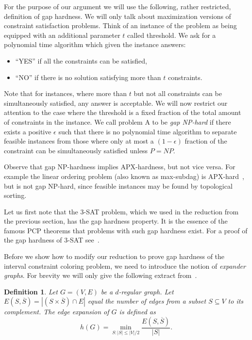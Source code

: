 \documentclass[a4paper,11pt]{article}
\theoremstyle{theorem}
\newtheorem{definition}[theorem]{Definition}
\begin{document}
For the purpose of our argument we will use the following, rather restricted, 
definition of gap hardness. We will only talk about 
maximization versions of constraint satisfaction problems.
Think of an instance of the problem as being equipped with an
additional parameter $t$ called threshold. We ask for a polynomial
time algorithm which given the instance answers: 
\begin{itemize}
\item
``YES'' if all the constraints
can be satisfied, 
\item
``NO'' if there is no solution satisfying
more than $t$ constraints.
\end{itemize}
Note that for instances, where more than $t$ but not all constraints
can be simultaneously satisfied, any answer is acceptable.
We will now restrict our attention to the case where the threshold is a fixed fraction
of the total amount of constraints in the instance. 
We call problem A to be \emph{gap NP-hard} if there exists a positive $\epsilon$
such that there is no polynomial time algorithm to separate feasible instances
from those where only at most a $(1-\epsilon)$ fraction of the constraint can be simultaneously
satisfied unless $P = NP$.

Observe that gap NP-hardness implies APX-hardness, but not vice versa.
For example the linear ordering problem (also known as max-subdag) is APX-hard~\cite{papa_apx}, 
but is not gap NP-hard, since feasible instances may be found by topological sorting.

Let us first note that the 3-SAT problem, which we used in the reduction
from the previous section, has the gap hardness property. It is the essence
of the famous PCP theorems that problems with such gap hardness exist.
For a proof of the gap hardness of 3-SAT see~\cite{gap_amp}.

Before we show how to modify our reduction to prove gap hardness of the interval constraint coloring problem,
we need to introduce the notion of \emph{expander graphs}. 
For brevity we will only give the following extract from~\cite{gap_amp}.

\begin{definition}
  Let $G = (V,E)$ be a $d$-regular graph. Let $E(S,\overline{S}) = | (S\times\overline{S}) \cap E |$
  equal the number of edges from a subset $S \subseteq V$ to its complement. The \emph{edge expansion}
  of $G$ is defined as
  \[
  h(G)= \min_{S:|S|\leq |V|/2}\frac{E(S,\overline{S})}{|S|}.
  \]
\end{definition}
\end{document}
